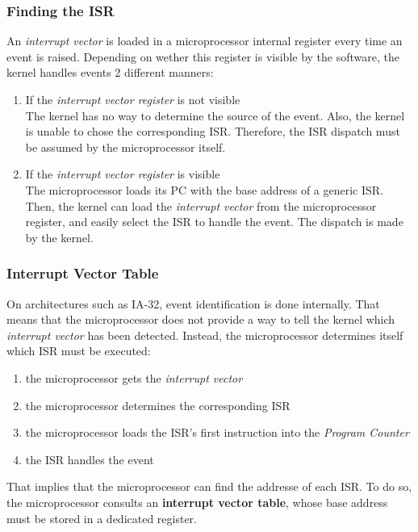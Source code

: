 \begin{frame}
  \frametitle{Finding the ISR}

  An {\em interrupt vector} is loaded in a microprocessor internal register
  every time an event is raised. Depending on wether this register is visible
  by the software, the kernel handles events 2 different manners:

  \-

  \begin{enumerate}
    \item If the {\em interrupt vector register} is not visible\\
      The kernel has no way to determine the source of the event. Also, the
      kernel is unable to chose the corresponding ISR. Therefore, the ISR
      dispatch must be assumed by the microprocessor itself.

      \-

    \item If the {\em interrupt vector register} is visible\\
      The microprocessor loads its PC with the base address of a generic ISR.
      Then, the kernel can load the {\em interrupt vector} from the
      microprocessor register, and easily select the ISR to handle the event.
      The dispatch is made by the kernel.
  \end{enumerate}

\end{frame}


%
%
%

\begin{frame}
  \frametitle{Interrupt Vector Table}

  On architectures such as IA-32, event identification is done internally. That
  means that the microprocessor does not provide a way to tell the kernel which
  {\em interrupt vector} has been detected. Instead, the microprocessor
  determines itself which ISR must be executed:

  \-

  \begin{enumerate}
    \item the microprocessor gets the {\em interrupt vector}
    \item the microprocessor determines the corresponding ISR
    \item the microprocessor loads the ISR's first instruction into the
      {\em Program Counter}
    \item the ISR handles the event
  \end{enumerate}

  \-

  That implies that the microprocessor can find the addresse of each ISR. To do
  so, the microprocessor consults an {\bf interrupt vector table}, whose base
  address must be stored in a dedicated register.

\end{frame}

